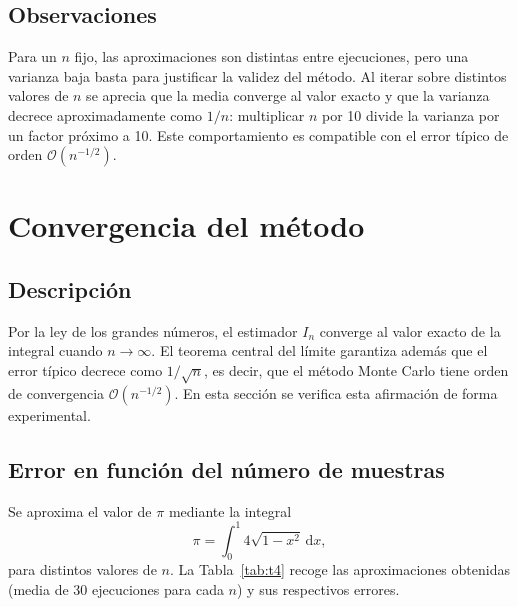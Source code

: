 \documentclass[11pt,a4paper]{article}
\begin{document}
\subsection{Observaciones}
Para un $n$ fijo, las aproximaciones son distintas entre ejecuciones, pero una varianza baja basta para justificar la validez del método. Al iterar sobre distintos valores de $n$ se aprecia que la media converge al valor exacto y que la varianza decrece aproximadamente como $1/n$: multiplicar $n$ por 10 divide la varianza por un factor próximo a 10. Este comportamiento es compatible con el error típico de orden $\mathcal{O}(n^{-1/2})$.

\section{Convergencia del método}

\subsection{Descripción}
Por la ley de los grandes números, el estimador $I_n$ converge al valor exacto de la integral cuando $n\to\infty$. El teorema central del límite garantiza además que el error típico decrece como $1/\sqrt{n}$, es decir, que el método Monte Carlo tiene orden de convergencia $\mathcal{O}(n^{-1/2})$. En esta sección se verifica esta afirmación de forma experimental.

\subsection{Error en función del número de muestras}
Se aproxima el valor de $\pi$ mediante la integral
\begin{equation}
\pi = \int_0^1 4\sqrt{1-x^2}\,\mathrm{d}x,
\end{equation}
para distintos valores de $n$. La Tabla~\ref{tab:t4} recoge las aproximaciones obtenidas (media de 30 ejecuciones para cada $n$) y sus respectivos errores.
\end{document}
